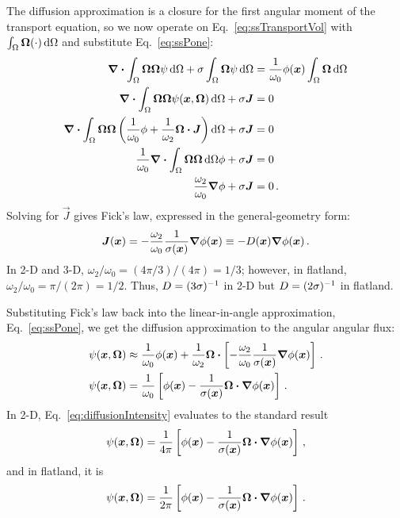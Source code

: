 The diffusion approximation is a closure for the first angular moment of
the transport equation, so we now operate on Eq.~\eqref{eq:ssTransportVol} with
$\int_\Omega \bm{\Omega} (\cdot) \mathop{}\!\mathrm{d} \Omega$ and substitute
Eq.~\eqref{eq:ssPone}:
\begin{align*}
  \bm{\nabla} \bm{\cdot} \int_\Omega \bm{\Omega} \bm{\Omega} \psi
  \mathop{}\!\mathrm{d}\Omega
  + \sigma \int_\Omega \bm{\Omega} \psi \mathop{}\!\mathrm{d}\Omega
  &= \frac{1}{\omega_0} \phi(\bm{x}) \int_\Omega \bm{\Omega} \mathop{}\!\mathrm{d}\Omega
  \\
  \bm{\nabla} \bm{\cdot} \int_\Omega \bm{\Omega} \bm{\Omega} \psi(\bm{x}, \bm{\Omega})
  \mathop{}\!\mathrm{d}\Omega
  + \sigma \bm{J}
  &= 0
  \\
  \bm{\nabla} \bm{\cdot} \int_\Omega \bm{\Omega} \bm{\Omega} \left(
  \frac{1}{\omega_0}\phi + \frac{1}{\omega_2} \bm{\Omega} \bm{\cdot} \bm{J}
  \right) \mathop{}\!\mathrm{d}\Omega
  + \sigma \bm{J}
  &= 0
  \\
  \frac{1}{\omega_0} \bm{\nabla} \bm{\cdot} \int_\Omega \bm{\Omega} \bm{\Omega}
  \mathop{}\!\mathrm{d}\Omega \phi 
  + \sigma \bm{J} &= 0
  \\
  \frac{\omega_2}{\omega_0} \bm{\nabla} \phi + \sigma \bm{J} &= 0 \,.
\end{align*}
Solving for $\vec{J}$ gives Fick's law, expressed in the general-geometry form:
\begin{equation} \label{eq:fickGeneral}
  \bm{J}(\bm{x})
  = - \frac{\omega_2}{\omega_0} \frac{1}{\sigma(\bm{x})} \bm{\nabla} \phi(\bm{x})
  \equiv -D(\bm{x}) \bm{\nabla} \phi(\bm{x})\,.
\end{equation}
In 2-D and 3-D, $\omega_2/\omega_0 = (4\pi / 3) / (4\pi) = 1/3$; however, in
flatland, $\omega_2/\omega_0 = \pi / (2\pi) = 1/2$. Thus, $D=(3\sigma)^{-1}$ in
2-D but $D=(2\sigma)^{-1}$ in flatland.

Substituting Fick's law back into the linear-in-angle approximation,
Eq.~\eqref{eq:ssPone}, we get the diffusion approximation to the angular
angular flux:
\begin{align} \nonumber
  \psi(\bm{x}, \bm{\Omega})
  &\approx \frac{1}{\omega_0} \phi(\bm{x})
  + \frac{1}{\omega_2} \bm{\Omega} \bm{\cdot} \left[ - \frac{\omega_2}{\omega_0}
  \frac{1}{\sigma(\bm{x})} \bm{\nabla} \phi(\bm{x}) \right]\,.
  \\ \label{eq:diffusionIntensity}
  \psi(\bm{x}, \bm{\Omega})
  &= \frac{1}{\omega_0} \left[ \phi(\bm{x})
  - \frac{1}{\sigma(\bm{x})}
  \bm{\Omega} \bm{\cdot} \bm{\nabla} \phi(\bm{x}) \right] \,.
\end{align}
In 2-D, Eq.~\eqref{eq:diffusionIntensity} evaluates to the standard result
\begin{equation*}
 \psi(\bm{x}, \bm{\Omega})
= \frac{1}{4\pi} \left[ \phi(\bm{x}) - \frac{1}{\sigma(\bm{x})} \bm{\Omega}
\bm{\cdot} \bm{\nabla} \phi(\bm{x}) \right] \,,
\end{equation*}
and in flatland, it is
\begin{equation}\label{eq:flatlandDiffusion}
 \psi(\bm{x}, \bm{\Omega})
= \frac{1}{2\pi} \left[ \phi(\bm{x}) - \frac{1}{\sigma(\bm{x})} \bm{\Omega}
\bm{\cdot} \bm{\nabla} \phi(\bm{x}) \right]\,.
\end{equation}

